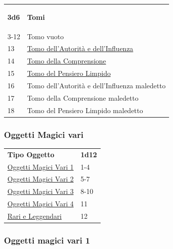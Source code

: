 \begin{multicols}{2}
{\medskip

{\small\begin{tabularx}{0.45\textwidth}{lX}\hypertarget{Tomi}{}
\textbf{3d6} & \textbf{Tomi}\\
3-12 & Tomo vuoto\\
13 & \hyperlink{Tomodell'Autoritàedell'Influenza}{Tomo dell'Autorità e dell'Influenza}\\
14 & \hyperlink{TomodellaComprensione}{Tomo della Comprensione}\\
15 & \hyperlink{TomodelPensieroLimpido}{Tomo del Pensiero Limpido}\\
16 & Tomo dell'Autorità e dell'Influenza maledetto\\
17 & Tomo della Comprensione maledetto\\
18 & Tomo del Pensiero Limpido maledetto
\end{tabularx}}

\subsubsection{Oggetti Magici vari}\hypertarget{oggettimagicivari}{}\label{oggettimagicivari}

{\small\begin{tabular}{ll}
\textbf{Tipo Oggetto} & \textbf{1d12}\\
\hyperlink{Oggetti Magici Vari 1}{Oggetti Magici Vari 1}&1-4\\
\hyperlink{Oggetti Magici Vari 2}{Oggetti Magici Vari 2}&5-7\\
\hyperlink{Oggetti Magici Vari 3}{Oggetti Magici Vari 3}&8-10\\
\hyperlink{Oggetti Magici Vari 4}{Oggetti Magici Vari 4}&11\\
\hyperlink{Rari e Leggendari}{Rari e Leggendari}&12
\end{tabular}}

\subsubsection{Oggetti magici vari 1}\hypertarget{Oggetti Magici Vari 1}{}

}
\end{multicols}
